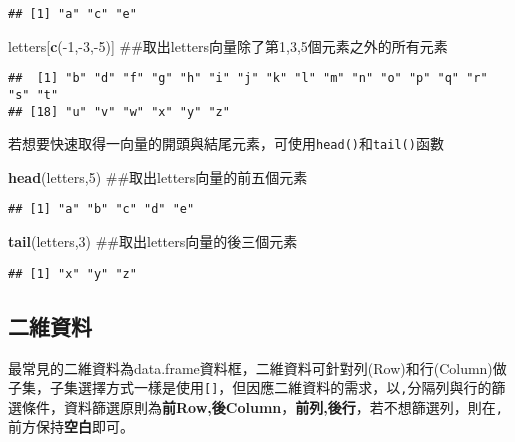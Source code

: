 \documentclass[]{book}
\newenvironment{Shaded}{\begin{snugshade}}{\end{snugshade}}
\newcommand{\KeywordTok}[1]{\textcolor[rgb]{0.13,0.29,0.53}{\textbf{{#1}}}}
\newcommand{\DecValTok}[1]{\textcolor[rgb]{0.00,0.00,0.81}{{#1}}}
\newcommand{\NormalTok}[1]{{#1}}
\begin{document}
\begin{verbatim}
## [1] "a" "c" "e"
\end{verbatim}

\begin{Shaded}
\begin{Highlighting}[]
\NormalTok{letters[}\KeywordTok{c}\NormalTok{(-}\DecValTok{1}\NormalTok{,-}\DecValTok{3}\NormalTok{,-}\DecValTok{5}\NormalTok{)] ##取出letters向量除了第1,3,5個元素之外的所有元素}
\end{Highlighting}
\end{Shaded}

\begin{verbatim}
##  [1] "b" "d" "f" "g" "h" "i" "j" "k" "l" "m" "n" "o" "p" "q" "r" "s" "t"
## [18] "u" "v" "w" "x" "y" "z"
\end{verbatim}

若想要快速取得一向量的開頭與結尾元素，可使用\texttt{head()}和\texttt{tail()}函數

\begin{Shaded}
\begin{Highlighting}[]
\KeywordTok{head}\NormalTok{(letters,}\DecValTok{5}\NormalTok{) ##取出letters向量的前五個元素}
\end{Highlighting}
\end{Shaded}

\begin{verbatim}
## [1] "a" "b" "c" "d" "e"
\end{verbatim}

\begin{Shaded}
\begin{Highlighting}[]
\KeywordTok{tail}\NormalTok{(letters,}\DecValTok{3}\NormalTok{) ##取出letters向量的後三個元素}
\end{Highlighting}
\end{Shaded}

\begin{verbatim}
## [1] "x" "y" "z"
\end{verbatim}

\subsection{二維資料}

最常見的二維資料為data.frame資料框，二維資料可針對列(Row)和行(Column)做子集，子集選擇方式一樣是使用\texttt{{[}{]}}，但因應二維資料的需求，以\texttt{,}分隔列與行的篩選條件，資料篩選原則為\textbf{前Row,後Column}，\textbf{前列,後行}，若不想篩選列，則在\texttt{,}前方保持\textbf{空白}即可。
\end{document}
